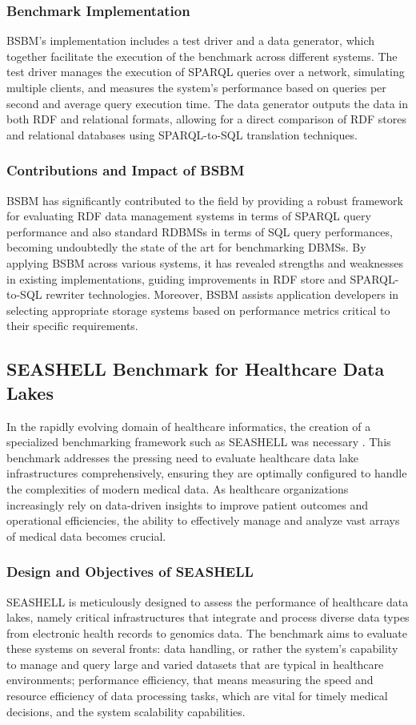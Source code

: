 \subsubsection{Benchmark Implementation}
BSBM's implementation includes a test driver and a data generator, which together facilitate the execution of the benchmark across different systems. The test driver manages the execution of SPARQL queries over a network, simulating multiple clients, and measures the system's performance based on queries per second and average query execution time.
The data generator outputs the data in both RDF and relational formats, allowing for a direct comparison of RDF stores and relational databases using SPARQL-to-SQL translation techniques.
\subsubsection{Contributions and Impact of BSBM}
\ac{BSBM} has significantly contributed to the field by providing a robust framework for evaluating RDF data management systems in terms of SPARQL query performance and also standard RDBMSs in terms of SQL query performances, becoming undoubtedly the state of the art for benchmarking \ac{DBMS}s. By applying \ac{BSBM} across various systems, it has revealed strengths and weaknesses in existing implementations, guiding improvements in RDF store and SPARQL-to-SQL rewriter technologies. Moreover, \ac{BSBM} assists application developers in selecting appropriate storage systems based on performance metrics critical to their specific requirements.

\subsection{SEASHELL Benchmark for Healthcare Data Lakes} \label{chp:dolci}
In the rapidly evolving domain of healthcare informatics, the creation of a specialized benchmarking framework such as \ac{SEASHELL} was necessary \cite{dolci2024tools}. This benchmark addresses the pressing need to evaluate healthcare data lake infrastructures comprehensively, ensuring they are optimally configured to handle the complexities of modern medical data. As healthcare organizations increasingly rely on data-driven insights to improve patient outcomes and operational efficiencies, the ability to effectively manage and analyze vast arrays of medical data becomes crucial.
\subsubsection{Design and Objectives of SEASHELL}
SEASHELL is meticulously designed to assess the performance of healthcare data lakes, namely critical infrastructures that integrate and process diverse data types from electronic health records to genomics data. The benchmark aims to evaluate these systems on several fronts: data handling, or rather the system's capability to manage and query large and varied datasets that are typical in healthcare environments; performance efficiency, that means measuring the speed and resource efficiency of data processing tasks, which are vital for timely medical decisions, and the system scalability capabilities.
